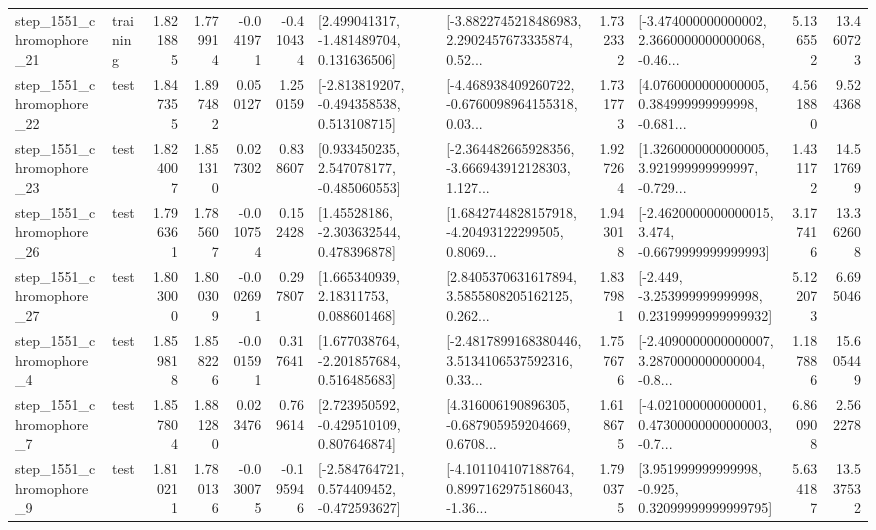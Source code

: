 \begin{tabular}{llrrrrllrlrr}
 step\_1551\_chromophore\_21 &  training &      1.821885 &    1.779914 &     -0.041971 & -0.410434 &    [2.499041317, -1.481489704, 0.131636506] &  [-3.8822745218486983, 2.2902457673335874, 0.52... &       1.732332 &  [-3.474000000000002, 2.3660000000000068, -0.46... &            5.136552 &         13.460723 \\
 step\_1551\_chromophore\_22 &      test &      1.847355 &    1.897482 &      0.050127 &  1.250159 &   [-2.813819207, -0.494358538, 0.513108715] &  [-4.468938409260722, -0.6760098964155318, 0.03... &       1.731773 &  [4.0760000000000005, 0.384999999999998, -0.681... &            4.561880 &          9.524368 \\
 step\_1551\_chromophore\_23 &      test &      1.824007 &    1.851310 &      0.027302 &  0.838607 &    [0.933450235, 2.547078177, -0.485060553] &  [-2.364482665928356, -3.666943912128303, 1.127... &       1.927264 &  [1.3260000000000005, 3.921999999999997, -0.729... &            1.431172 &         14.517699 \\
 step\_1551\_chromophore\_26 &      test &      1.796361 &    1.785607 &     -0.010754 &  0.152428 &     [1.45528186, -2.303632544, 0.478396878] &  [1.6842744828157918, -4.20493122299505, 0.8069... &       1.943018 &  [-2.4620000000000015, 3.474, -0.6679999999999993] &            3.177416 &         13.362608 \\
 step\_1551\_chromophore\_27 &      test &      1.803000 &    1.800309 &     -0.002691 &  0.297807 &      [1.665340939, 2.18311753, 0.088601468] &  [2.8405370631617894, 3.5855808205162125, 0.262... &       1.837981 &  [-2.449, -3.253999999999998, 0.23199999999999932] &            5.122073 &          6.695046 \\
  step\_1551\_chromophore\_4 &      test &      1.859818 &    1.858226 &     -0.001591 &  0.317641 &    [1.677038764, -2.201857684, 0.516485683] &  [-2.4817899168380446, 3.5134106537592316, 0.33... &       1.757676 &  [-2.4090000000000007, 3.2870000000000004, -0.8... &            1.187886 &         15.605449 \\
  step\_1551\_chromophore\_7 &      test &      1.857804 &    1.881280 &      0.023476 &  0.769614 &    [2.723950592, -0.429510109, 0.807646874] &  [4.316006190896305, -0.687905959204669, 0.6708... &       1.618675 &  [-4.021000000000001, 0.47300000000000003, -0.7... &            6.860908 &          2.562278 \\
  step\_1551\_chromophore\_9 &      test &      1.810211 &    1.780136 &     -0.030075 & -0.195946 &   [-2.584764721, 0.574409452, -0.472593627] &  [-4.101104107188764, 0.8997162975186043, -1.36... &       1.790375 &   [3.951999999999998, -0.925, 0.32099999999999795] &            5.634187 &         13.537532 \\

\end{tabular}
